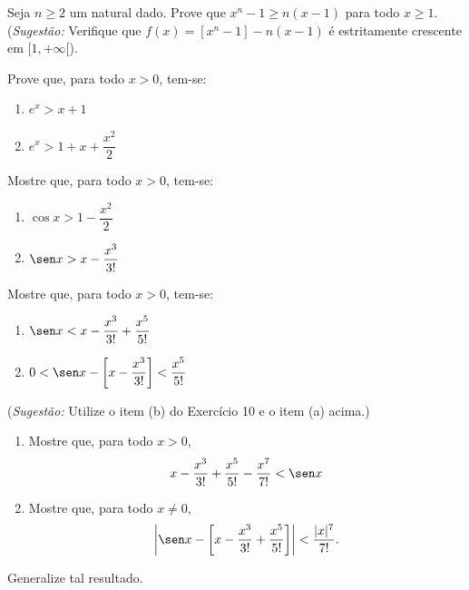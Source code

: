 \begin{exercicio}[8]
Seja $n \ge 2$ um natural dado. Prove que $x^n - 1 \ge n(x - 1)$ para todo $x \ge 1$.\\
(\textit{Sugestão:} Verifique que $f(x) = [x^n - 1] - n(x - 1)$ é estritamente crescente em $[1, +\infty[$).
\end{exercicio}

\begin{exercicio}[9]
Prove que, para todo $x > 0$, tem-se:
\begin{enumerate}[label=\alph*)]
    \item $e^x > x + 1$
    \item $e^x > 1 + x + \dfrac{x^2}{2}$
\end{enumerate}
\end{exercicio}

\begin{exercicio}[10]
Mostre que, para todo $x > 0$, tem-se:
\begin{enumerate}[label=\alph*)]
    \item $\cos x > 1 - \dfrac{x^2}{2}$
    \item $\sen x > x - \dfrac{x^3}{3!}$
\end{enumerate}
\end{exercicio}

\begin{exercicio}[11]
Mostre que, para todo $x > 0$, tem-se:
\begin{enumerate}[label=\alph*)]
    \item $\sen x < x - \dfrac{x^3}{3!} + \dfrac{x^5}{5!}$
    \item $0 < \sen x - \left[ x - \dfrac{x^3}{3!} \right] < \dfrac{x^5}{5!}$
\end{enumerate}
(\textit{Sugestão:} Utilize o item (b) do Exercício 10 e o item (a) acima.)
\end{exercicio}

\begin{exercicio}[12]
\begin{enumerate}[label=\alph*)]
    \item Mostre que, para todo $x > 0$,
    \[
    x - \dfrac{x^3}{3!} + \dfrac{x^5}{5!} - \dfrac{x^7}{7!} < \sen x
    \]
    \item Mostre que, para todo $x \neq 0$,
    \[
    \left| \sen x - \left[ x - \dfrac{x^3}{3!} + \dfrac{x^5}{5!} \right] \right| < \dfrac{|x|^7}{7!}.
    \]
\end{enumerate}
Generalize tal resultado.
\end{exercicio}

